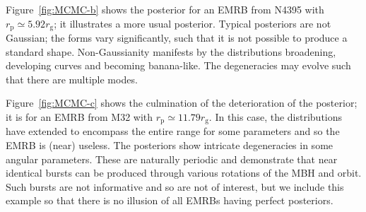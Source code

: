\documentclass[useAMS,usedcolumn,usegraphicx,usenatbib]{mn2e}
\newcommand{\Figref}[1]{Figure~\ref{fig:#1}}
\newcommand{\sub}[1]{\ensuremath{_\mathrm{#1}}}
\begin{document}
\Figref{MCMC-b} shows the posterior for an EMRB from N4395 with $r\sub{p} \simeq 5.92 r\sub{g}$; it illustrates a more usual posterior. Typical posteriors are not Gaussian; the forms vary significantly, such that it is not possible to produce a standard shape. Non-Gaussianity manifests by the distributions broadening, developing curves and becoming banana-like. The degeneracies may evolve such that there are multiple modes.

\Figref{MCMC-c} shows the culmination of the deterioration of the posterior; it is for an EMRB from M32 with $r\sub{p} \simeq 11.79 r\sub{g}$. In this case, the distributions have extended to encompass the entire range for some parameters and so the EMRB is (near) useless. The posteriors show intricate degeneracies in some angular parameters. These are naturally periodic and demonstrate that near identical bursts can be produced through various rotations of the MBH and orbit. Such bursts are not informative and so are not of interest, but we include this example so that there is no illusion of all EMRBs having perfect posteriors.

\bsp

\label{lastpage}
\end{document}
